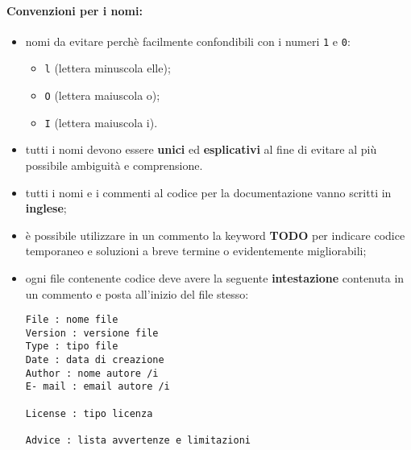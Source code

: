 \documentclass[NormeDiProgetto.tex]{subfiles}
\begin{document}
\paragraph*{Convenzioni per i nomi: }

\begin{itemize}
\item nomi da evitare perchè facilmente confondibili con i numeri \texttt{1} e \texttt{0}:
\begin{itemize}
\item \texttt{l} (lettera minuscola elle);
\item \texttt{O} (lettera maiuscola o);
\item \texttt{I} (lettera maiuscola i).
\end{itemize}
\item tutti i nomi devono essere \textbf{unici} ed \textbf{esplicativi} al fine di evitare al più possibile ambiguità e comprensione.
\item tutti i nomi e i commenti al codice per la documentazione vanno scritti in \textbf{inglese};
\item è possibile utilizzare in un commento la keyword \textbf{TODO} per indicare codice temporaneo e soluzioni a breve termine o evidentemente migliorabili;
\item ogni file contenente codice deve avere la seguente \textbf{intestazione} contenuta in un commento e posta all'inizio del file stesso:
\begin{center}{
	\begin{minipage}{12cm}
		\begin{Verbatim}[frame=single]
File : nome file
Version : versione file
Type : tipo file
Date : data di creazione
Author : nome autore /i
E- mail : email autore /i

License : tipo licenza

Advice : lista avvertenze e limitazioni


\end{Verbatim}
\end{minipage}}
\end{center}
\end{itemize}
\end{document}
